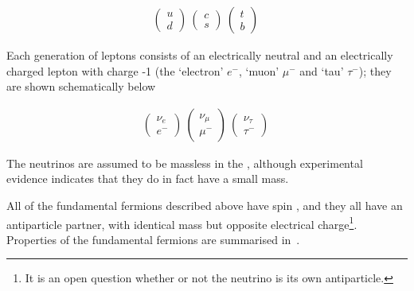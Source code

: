 \begin{align}
\left( \begin{array}{c} u \\ d \end{array} \right) \ 
\left( \begin{array}{c} c \\ s \end{array} \right) \ 
\left( \begin{array}{c} t \\ b \end{array} \right) \ 
\end{align}

Each generation of leptons consists of an electrically neutral 
and an electrically charged lepton with charge -1 (the `electron' $e^{-}$, `muon' $\mu^{-}$ and
`tau' $\tau^{-}$); they are shown schematically below

\begin{align}
\left( \begin{array}{c} \nu_{e} \\ e^{-} \end{array} \right) \ 
\left( \begin{array}{c} \nu_{\mu} \\ \mu^{-} \end{array} \right) \ 
\left( \begin{array}{c} \nu_{\tau} \\ \tau^{-} \end{array} \right) \ 
\end{align} 

The neutrinos are assumed to be massless in the \sm, although experimental
evidence indicates that they do in fact have a small mass.

All of the fundamental fermions described above have spin , and they all have an antiparticle partner, with
identical mass but opposite electrical charge\footnote{It is an open question
whether or not the neutrino is its own antiparticle.}.
Properties of the fundamental fermions are summarised in~.

